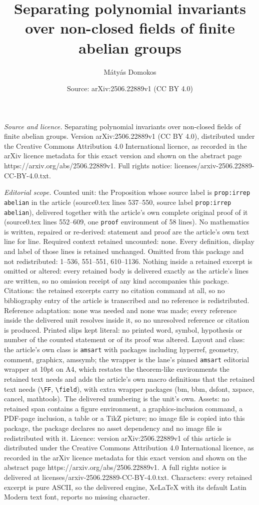 \documentclass[10pt,a4paper]{amsart}
\title[Separating polynomial invariants over non-closed fields of f]{Separating polynomial invariants over non-closed fields of finite abelian groups}
\author{M\'aty\'as Domokos}
\date{Source: arXiv:2506.22889v1 (CC BY 4.0)}
\begin{document}
\maketitle

\noindent\emph{Source and licence.} Separating polynomial invariants over non-closed fields of finite abelian groups. Version arXiv:2506.22889v1 (CC BY 4.0), distributed under the Creative Commons Attribution 4.0 International licence, as recorded in the arXiv licence metadata for this exact version and shown on the abstract page https://arxiv.org/abs/2506.22889v1. Full rights notice: licenses/arxiv-2506.22889-CC-BY-4.0.txt.\par\smallskip

\noindent\textit{Editorial scope.} Counted unit: the Proposition whose source label is \texttt{prop:irrep abelian} in the article (source0.tex lines 537--550, source label \texttt{prop:irrep abelian}), delivered together with the article's own complete original proof of it (source0.tex lines 552--609, one \texttt{proof} environment of 58 lines). No mathematics is written, repaired or re-derived: statement and proof are the article's own text line for line. Required context retained uncounted: none. Every definition, display and label of those lines is retained unchanged. Omitted from this package and not redistributed: 1--536, 551--551, 610--1136. Nothing inside a retained excerpt is omitted or altered: every retained body is delivered exactly as the article's lines are written, so no omission receipt of any kind accompanies this package. Citations: the retained excerpts carry no citation command at all, so no bibliography entry of the article is transcribed and no reference is redistributed. Reference adaptation: none was needed and none was made; every reference inside the delivered unit resolves inside it, so no unresolved reference or citation is produced. Printed slips kept literal: no printed word, symbol, hypothesis or number of the counted statement or of its proof was altered. Layout and class: the article's own class is \texttt{amsart} with packages including hyperref, geometry, comment, graphicx, amssymb; the wrapper is the lane's pinned \texttt{amsart} editorial wrapper at 10pt on A4, which restates the theorem-like environments the retained text needs and adds the article's own macro definitions that the retained text needs (\texttt{\textbackslash FF}, \texttt{\textbackslash field}), with extra wrapper packages (bm, bbm, dsfont, xspace, cancel, mathtools). The delivered numbering is the unit's own. Assets: no retained span contains a figure environment, a graphics-inclusion command, a PDF-page inclusion, a table or a TikZ picture; no image file is copied into this package, the package declares no asset dependency and no image file is redistributed with it. Licence: version arXiv:2506.22889v1 of this article is distributed under the Creative Commons Attribution 4.0 International licence, as recorded in the arXiv licence metadata for this exact version and shown on the abstract page https://arxiv.org/abs/2506.22889v1. A full rights notice is delivered at licenses/arxiv-2506.22889-CC-BY-4.0.txt. Characters: every retained excerpt is pure ASCII, so the delivered engine, XeLaTeX with its default Latin Modern text font, reports no missing character.
\end{document}
